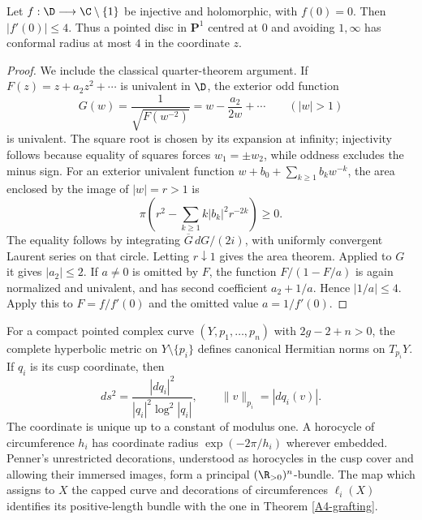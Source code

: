 \begin{lemma}\label{A1-cap-bound}
Let $f:\D\longrightarrow\C\setminus\{1\}$ be injective and holomorphic, with $f(0)=0$. Then $|f'(0)|\leq4$. Thus a pointed disc in $\mathbf P^1$ centred at $0$ and avoiding $1,\infty$ has conformal radius at most $4$ in the coordinate $z$.
\end{lemma}
\begin{proof}
We include the classical quarter-theorem argument. If $F(z)=z+a_2z^2+\cdots$ is univalent in $\D$, the exterior odd function
\[
G(w)=\frac{1}{\sqrt{F(w^{-2})}}=w-\frac{a_2}{2w}+\cdots\qquad(|w|>1)
\]
is univalent. The square root is chosen by its expansion at infinity; injectivity follows because equality of squares forces $w_1=\pm w_2$, while oddness excludes the minus sign. For an exterior univalent function $w+b_0+\sum_{k\geq1}b_kw^{-k}$, the area enclosed by the image of $|w|=r>1$ is
\[
\pi\left(r^2-\sum_{k\geq1}k|b_k|^2r^{-2k}\right)\geq0.
\]
The equality follows by integrating $\overline G\,dG/(2i)$, with uniformly convergent Laurent series on that circle. Letting $r\downarrow1$ gives the area theorem. Applied to $G$ it gives $|a_2|\leq2$. If $a\ne0$ is omitted by $F$, the function $F/(1-F/a)$ is again normalized and univalent, and has second coefficient $a_2+1/a$. Hence $|1/a|\leq4$. Apply this to $F=f/f'(0)$ and the omitted value $a=1/f'(0)$.
\end{proof}
\begin{proposition}\label{A2-cusp-norm}
For a compact pointed complex curve $(Y,p_1,\ldots,p_n)$ with $2g-2+n>0$, the complete hyperbolic metric on $Y\setminus\{p_i\}$ defines canonical Hermitian norms on $T_{p_i}Y$. If $q_i$ is its cusp coordinate, then
\[
 ds^2=\frac{|dq_i|^2}{|q_i|^2\log^2|q_i|},\qquad
 \|v\|_{p_i}=|dq_i(v)|.
\]
The coordinate is unique up to a constant of modulus one. A horocycle of circumference $h_i$ has coordinate radius $\exp(-2\pi/h_i)$ wherever embedded. Penner's unrestricted decorations, understood as horocycles in the cusp cover and allowing their immersed images, form a principal $(\R_{>0})^n$-bundle. The map which assigns to $X$ the capped curve and decorations of circumferences $\ell_i(X)$ identifies its positive-length bundle with the one in Theorem \ref{A4-grafting}.
\end{proposition}
